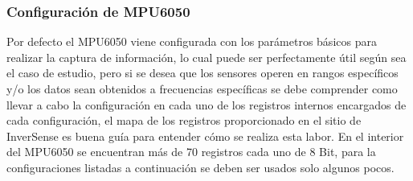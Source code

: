 \documentclass[12pt,a4paper]{article}
\begin{document}
\subsubsection{Configuración de MPU6050}
Por defecto el MPU6050 viene configurada con los parámetros básicos para realizar la captura de información, lo cual puede ser perfectamente útil según sea el caso de estudio, pero si se desea que los sensores operen en rangos específicos y/o los datos sean obtenidos a frecuencias específicas se debe comprender como llevar a cabo la configuración en cada uno de los registros internos encargados de cada configuración, el mapa de los registros \cite{MAPREGISTER} proporcionado  en el sitio de InverSense es buena guía para entender cómo se realiza esta labor.
\newline En el interior del MPU6050 se encuentran más de 70 registros cada uno de 8 Bit, para la configuraciones listadas a continuación se deben ser usados solo algunos pocos.
\end{document}
